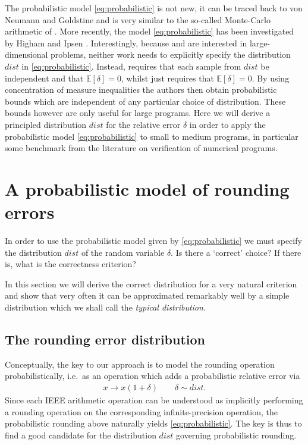 \documentclass[10pt,conference]{IEEEtran}
\newcommand{\ie}{i.e.\ }
\newcommand{\Exp}[1]{\mathbb{E}\left[#1\right]}
\begin{document}
The probabilistic model \cref{eq:probabilistic} is not new, it can be traced back to von Neumann and Goldstine \cite{von1947numerical} and is very similar to the so-called Monte-Carlo arithmetic of \cite{parker1997monte}. More recently, the model \cref{eq:probabilistic} has been investigated by Higham \cite{higham2019new}
and Ipsen \cite{ipsen2019probabilistic}. Interestingly, because \cite{higham2019new} and \cite{ipsen2019probabilistic} are interested in large-dimensional problems, neither work needs to explicitly specify the distribution $dist$ in \cref{eq:probabilistic}. Instead, \cite{higham2019new} requires that each sample from $dist$ be independent and that $\Exp{\delta}=0$, whilst \cite{ipsen2019probabilistic} just requires that $\Exp{\delta}=0$. By using concentration of measure inequalities the authors then obtain probabilistic bounds which are independent of any particular choice of distribution. 
These bounds however are only useful for large programs. Here we will derive a principled distribution $dist$ for the relative error $\delta$ in order to apply the probabilistic model \cref{eq:probabilistic} to small to medium programs, in particular some benchmark from the literature on verification of numerical programs.

\section{A probabilistic model of rounding errors}

In order to use the probabilistic model given by \cref{eq:probabilistic} we must specify the distribution $dist$ of the random variable $\delta$. Is there a `correct' choice? If there is, what is the correctness criterion? 

In this section we will derive the correct distribution for a very natural criterion and show that very often it can be approximated remarkably well by a simple distribution which we shall call the \emph{typical distribution}. 

\subsection{The rounding error distribution}\label{subsec:error_dist}

Conceptually, the key to our approach is to model the rounding operation probabilistically, \ie as an operation which adds a probabilistic relative error via
\begin{align}
x \longrightarrow x(1+\delta)\qquad \delta\sim dist.\label{eq:rounding}
\end{align}
Since each IEEE arithmetic operation can be understood as implicitly performing a rounding operation on the corresponding infinite-precision operation, the probabilistic rounding above naturally yields \cref{eq:probabilistic}. The key is thus to find a good candidate for the distribution $dist$ governing probabilistic rounding.
\end{document}
